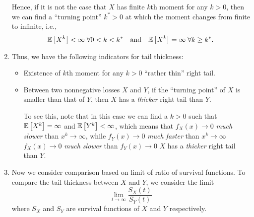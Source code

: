 \begin{enumerate}
Hence, if it is not the case that \(X\) has finite \(k\)th moment for any
\(k>0\), then we can find a ``turning point'' \(k^*>0\) at which the moment
changes from finite to infinite, i.e.,
\[
\expv{X^k}<\infty\;\forall 0<k< k^*\qqtext{and}
\expv{X^k}=\infty\;\forall k\ge k^*.
\]
\begin{center}
\end{center}
\item Thus, we have the following indicators for tail thickness:
\begin{itemize}
\item Existence of \(k\)th moment for any \(k>0\)  ``rather thin'' right tail.
\item Between two nonnegative losses \(X\) and \(Y\), if the ``turning point''
of \(X\) is smaller than that of \(Y\), then \(X\) has a \emph{thicker} right
tail than \(Y\). \begin{note}
To see this, note that in this case we can find a \(k>0\) such that
\(\mathbb{E}\left[X^k\right]=\infty\) and \(\mathbb{E}\left[Y^k\right]<\infty\), which means that \(f_X(x)\to
0\) \emph{much slower} than \(x^k\to\infty\), while \(f_Y(x)\to 0\) \emph{much faster}
than \(x^k\to\infty\)  \(f_X(x)\to 0\) \emph{much slower} than
\(f_Y(x)\to 0\)  \(X\) has a \emph{thicker} right tail than
\(Y\).
\end{note}
\end{itemize}
\item Now we consider comparison based on limit of ratio of survival functions.
To compare the tail thickness between \(X\) and \(Y\), we consider the limit
\[
\lim_{t\to \infty}\frac{S_X(t)}{S_Y(t)}
\]
where \(S_X\) and \(S_Y\) are survival functions of \(X\) and \(Y\) respectively.


\end{enumerate}
